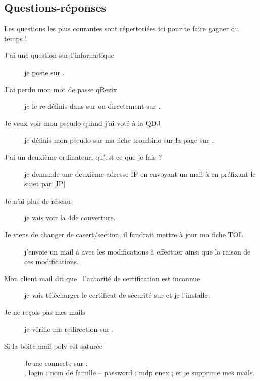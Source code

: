 
\subsection{Questions-réponses}

Les questions les plus courantes sont répertoriées ici pour te faire gagner du temps !

\begin{description}

\item[J'ai une question sur l'informatique] je poste sur .

\item[J'ai perdu mon mot de passe qRezix] je le re-définis dans  sur \fkz ou directement sur .

\item[Je veux voir mon pseudo quand j'ai voté à la QDJ] je définis mon pseudo sur ma fiche \linebreak trombino sur la page  sur \fkz.

\item[J'ai un deuxième ordinateur, qu'est-ce que je fais ?] je demande une deuxième adresse IP en envoyant un mail à  en préfixant le sujet par [IP] 

\item[Je n'ai plus de réseau] je vais voir la 4\ieme de couverture.

\item[Je viens de changer de casert/section, il faudrait mettre à jour ma fiche TOL] j'envoie \linebreak un mail à  avec les modifications à effectuer ainsi que la raison de ces
modifications.

\item[Mon client mail dit que \guillemotleft~l'autorité de certification est inconnue~\guillemotright ] je vais télécharger le certificat de sécurité sur  et je l'installe.

\item[Je ne reçois pas mes mails] je vérifie ma redirection sur .

\item[Si la boite mail poly est saturée] Je me connecte sur :\\
, 
login : nom de famille --
password : mdp enex ; et je supprime mes mails.



\end{description}
